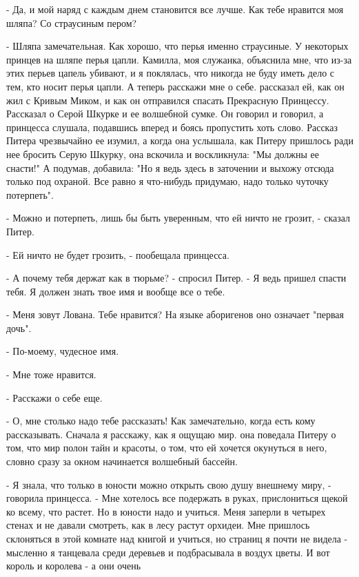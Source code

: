 \par- Да, и мой наряд с каждым днем становится все лучше. Как тебе 
нравится моя шляпа? Со страусиным пером?
\par- Шляпа замечательная. Как хорошо, что перья именно страусиные. У 
некоторых принцев на шляпе перья цапли. Камилла, моя служанка, 
объяснила мне, что из-за этих перьев цапель убивают, и я поклялась, 
что никогда не буду иметь дело с тем, кто носит перья цапли. А теперь 
расскажи мне о себе.
 рассказал ей, как он жил с Кривым Миком, и как он отправился 
спасать Прекрасную Принцессу. Рассказал о Серой Шкурке и ее волшебной 
сумке. Он говорил и говорил, а принцесса слушала, подавшись вперед и 
боясь пропустить хоть слово. Рассказ Питера чрезвычайно ее изумил, а 
когда она услышала, как Питеру пришлось ради нее бросить Серую Шкурку, 
она вскочила и воскликнула: "Мы должны ее снасти!" А подумав, 
добавила: "Но я ведь здесь в заточении и выхожу отсюда только под 
охраной. Все равно я что-нибудь придумаю, надо только чуточку 
потерпеть".
\par- Можно и потерпеть, лишь бы быть уверенным, что ей ничто не 
грозит, - сказал Питер.
\par- Ей ничто не будет грозить, - пообещала принцесса.
\par- А почему тебя держат как в тюрьме? - спросил Питер. - Я ведь 
пришел спасти тебя. Я должен знать твое имя и вообще все о тебе.
\par- Меня зовут Лована. Тебе нравится? На языке аборигенов оно 
означает "первая дочь".
\par- По-моему, чудесное имя.
\par- Мне тоже нравится.
\par- Расскажи о себе еще.
\par- О, мне столько надо тебе рассказать! Как замечательно, когда 
есть кому рассказывать. Сначала я расскажу, как я ощущаю мир.
 она поведала Питеру о том, что мир полон тайн и красоты, о том, 
что ей хочется окунуться в него, словно сразу за окном начинается 
волшебный бассейн.
\par- Я знала, что только в юности можно открыть свою душу внешнему 
миру, - говорила принцесса. - Мне хотелось все подержать в руках, 
прислониться щекой ко всему, что растет. Но в юности надо и учиться. 
Меня заперли в четырех стенах и не давали смотреть, как в лесу растут 
орхидеи. Мне пришлось склоняться в этой комнате над книгой и учиться, 
но страниц я почти не видела - мысленно я танцевала среди деревьев и 
подбрасывала в воздух цветы. И вот король и королева - а они очень 
